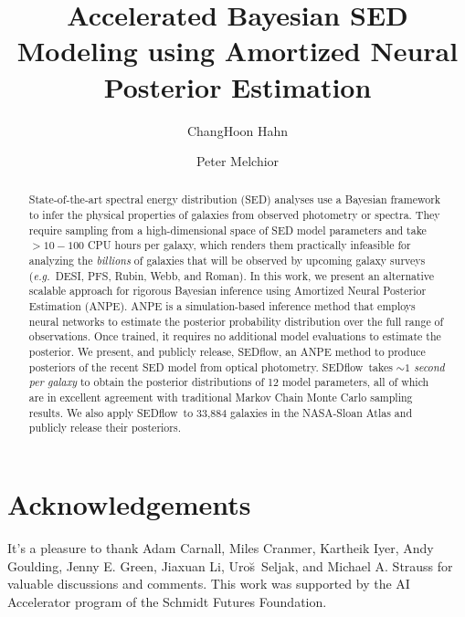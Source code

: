 \documentclass[12pt, letterpaper, preprint, comicneue]{aastex63}
\newcommand{\eg}{\emph{e.g.}}
\newcommand{\github}{\href{https://github.com/changhoonhahn/SEDflow/}{\faGithub}}
\newcommand{\sedflow}{{\sc SEDflow}}
\begin{document}
 \sloppy\sloppypar\frenchspacing 

\title{Accelerated Bayesian SED Modeling using Amortized Neural Posterior Estimation}

\author[0000-0003-1197-0902]{ChangHoon Hahn}

\author[0000-0002-8873-5065]{Peter Melchior}

\begin{abstract}
    State-of-the-art spectral energy distribution (SED) analyses use a
    Bayesian framework to infer the physical properties of galaxies from
    observed photometry or spectra.
    They require sampling from a high-dimensional space of SED model parameters
    and take $>10-100$ CPU hours per galaxy, which renders them practically
    infeasible for analyzing the {\em billions} of galaxies that will be
    observed by upcoming galaxy surveys (\eg~DESI, PFS, Rubin, Webb, and Roman).
    In this work, we present an alternative scalable approach for
    rigorous Bayesian inference using Amortized Neural Posterior
    Estimation (ANPE). 
    ANPE is a simulation-based inference method that employs neural networks
    to estimate the posterior probability distribution over the full
    range of observations.
    Once trained, it requires no additional model evaluations to estimate the
    posterior.  
    We present, and publicly release, \sedflow, an ANPE method to produce
    posteriors of the recent \cite{hahn2022} SED model from optical
    photometry.
    \sedflow~takes \emph{${\sim}1$ second per galaxy} to obtain the posterior
    distributions of 12 model parameters, all of which are in excellent
    agreement with traditional Markov Chain Monte Carlo sampling results.
    We also apply \sedflow~to 33,884 galaxies in the NASA-Sloan Atlas and
    publicly release their posteriors.
    \github
\end{abstract}



\pagebreak






\section*{Acknowledgements}
It's a pleasure to thank 
    Adam Carnall, 
    Miles Cranmer, 
    Kartheik Iyer,
    Andy Goulding,
    Jenny E. Green,
    Jiaxuan Li, 
    Uro{\u s}~Seljak,
    and 
    Michael A. Strauss
for valuable discussions and comments.
This work was supported by the AI Accelerator program of the Schmidt Futures Foundation.

\appendix

%
 
\end{document}
